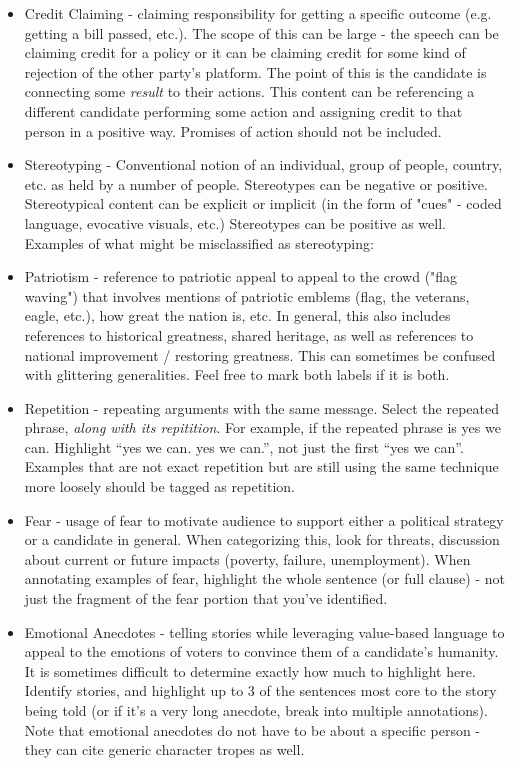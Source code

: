 \documentclass[letterpaper]{article}
\begin{document}
\begin{itemize}
	\item Credit Claiming - claiming responsibility for getting a specific outcome (e.g. getting a bill passed, etc.). The scope of this can be large - the speech can be claiming credit for a policy or it can be claiming credit for some kind of rejection of the other party's platform. The point of this is the candidate is connecting some \emph{result} to their actions. This content can be referencing a different candidate performing some action and assigning credit to that person in a positive way. Promises of action should not be included. \\
	\item Stereotyping - Conventional notion of an individual, group of people, country, etc. as held by a number of people.  Stereotypes can be negative or positive. Stereotypical content can be explicit or implicit (in the form of "cues" - coded language, evocative visuals, etc.) Stereotypes can be positive as well.
	Examples of what might be misclassified as stereotyping: \\
	\item Patriotism - reference to patriotic appeal to appeal to the crowd ("flag waving") that involves mentions of patriotic emblems (flag, the veterans, eagle, etc.), how great the nation is, etc. In general, this also includes references to historical greatness, shared heritage, as well as references to national improvement / restoring greatness. This can sometimes be confused with glittering generalities. Feel free to mark both labels if it is both.
	\item Repetition - repeating arguments with the same message. Select the repeated phrase, \emph{along with its repitition}. For example, if the repeated phrase is yes we can. Highlight ``yes we can. yes we can.'', not just the first ``yes we can''. Examples that are not exact repetition but are still using the same technique more loosely should be tagged as repetition.
	\item Fear - usage of fear to motivate audience to support either a political strategy or a candidate in general.
		When categorizing this, look for threats, discussion about current or future impacts (poverty, failure, unemployment). When annotating examples of fear, highlight the whole sentence (or full clause) - not just the fragment of the fear portion that you've identified.
	\item Emotional Anecdotes - telling stories while leveraging value-based language to appeal to the emotions of voters to convince them of a candidate's humanity. It is sometimes difficult to determine exactly how much to highlight here. Identify stories, and highlight up to 3 of the sentences most core to the story being told (or if it's a very long anecdote, break into multiple annotations). Note that emotional anecdotes do not have to be about a specific person - they can cite generic character tropes as well. \\
\end{itemize}
\end{document}
